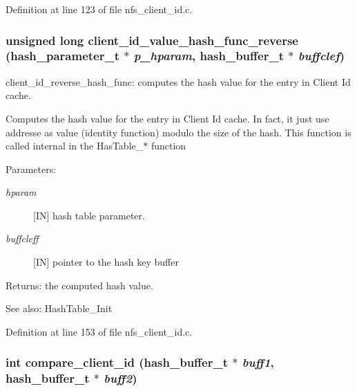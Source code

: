 Definition at line 123 of file nfs\_\-client\_\-id.c.
\subsubsection{\setlength{\rightskip}{0pt plus 5cm}unsigned long client\_\-id\_\-value\_\-hash\_\-func\_\-reverse (hash\_\-parameter\_\-t $\ast$ {\em p\_\-hparam}, hash\_\-buffer\_\-t $\ast$ {\em buffclef})}\label{nfs__client__id_8c_a5}


client\_\-id\_\-reverse\_\-hash\_\-func: computes the hash value for the entry in Client Id cache.

Computes the hash value for the entry in Client Id cache. In fact, it just use addresse as value (identity function) modulo the size of the hash. This function is called internal in the Has\-Table\_\-$\ast$ function

\begin{Desc}
\item[Parameters:]
\begin{description}
\item[{\em hparam}][IN] hash table parameter. \item[{\em buffcleff}][IN] pointer to the hash key buffer\end{description}
\end{Desc}
\begin{Desc}
\item[Returns:]the computed hash value.\end{Desc}
\begin{Desc}
\item[See also:]Hash\-Table\_\-Init \end{Desc}


Definition at line 153 of file nfs\_\-client\_\-id.c.
\subsubsection{\setlength{\rightskip}{0pt plus 5cm}int compare\_\-client\_\-id (hash\_\-buffer\_\-t $\ast$ {\em buff1}, hash\_\-buffer\_\-t $\ast$ {\em buff2})}\label{nfs__client__id_8c_a8}


